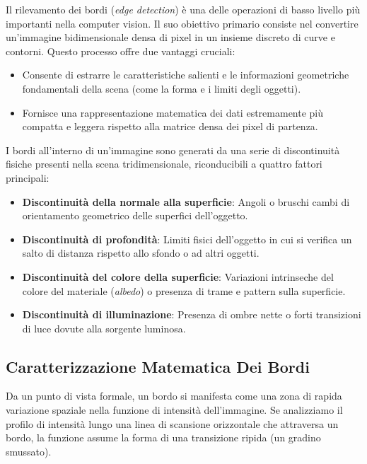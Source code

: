 ﻿\documentclass[11pt, a4paper]{article}
\begin{document}
Il rilevamento dei bordi (\emph{edge detection}) è una delle operazioni di basso livello più importanti nella computer vision. Il suo obiettivo primario consiste nel convertire un'immagine bidimensionale densa di pixel in un insieme discreto di curve e contorni. Questo processo offre due vantaggi cruciali:
\begin{itemize}
    \item Consente di estrarre le caratteristiche salienti e le informazioni geometriche fondamentali della scena (come la forma e i limiti degli oggetti).
    \item Fornisce una rappresentazione matematica dei dati estremamente più compatta e leggera rispetto alla matrice densa dei pixel di partenza.
\end{itemize}


I bordi all'interno di un'immagine sono generati da una serie di discontinuità fisiche presenti nella scena tridimensionale, riconducibili a quattro fattori principali:
\begin{itemize}
    \item \textbf{Discontinuità della normale alla superficie}: Angoli o bruschi cambi di orientamento geometrico delle superfici dell'oggetto.
    \item \textbf{Discontinuità di profondità}: Limiti fisici dell'oggetto in cui si verifica un salto di distanza rispetto allo sfondo o ad altri oggetti.
    \item \textbf{Discontinuità del colore della superficie}: Variazioni intrinseche del colore del materiale (\emph{albedo}) o presenza di trame e pattern sulla superficie.
    \item \textbf{Discontinuità di illuminazione}: Presenza di ombre nette o forti transizioni di luce dovute alla sorgente luminosa.
\end{itemize}


\subsection{Caratterizzazione Matematica Dei Bordi}

Da un punto di vista formale, un bordo si manifesta come una zona di rapida variazione spaziale nella funzione di intensità dell'immagine. Se analizziamo il profilo di intensità lungo una linea di scansione orizzontale che attraversa un bordo, la funzione assume la forma di una transizione ripida (un gradino smussato).
\end{document}
